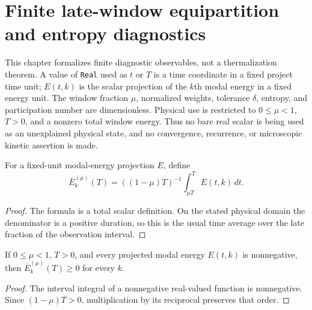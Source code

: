 
\chapter{Finite late-window equipartition and entropy diagnostics}
\label{ch:ArchonPhysics_EquipartitionEntropy}

This chapter formalizes finite diagnostic observables, not a thermalization
theorem.  A value of \texttt{Real} used as $t$ or $T$ is a time coordinate in
a fixed project time unit; $E(t,k)$ is the scalar projection of the $k$th
modal energy in a fixed energy unit.  The window fraction $\mu$, normalized
weights, tolerance $\delta$, entropy, and participation number are
dimensionless.  Physical use is restricted to $0\leq\mu<1$, $T>0$, and a
nonzero total window energy.  Thus no bare real scalar is being used as an
unexplained physical state, and no convergence, recurrence, or microscopic
kinetic assertion is made.

\begin{definition}
\label{def:thermal:late-window-average}
For a fixed-unit modal-energy projection $E$, define
\[
 \overline E_k^{(\mu)}(T)=((1-\mu)T)^{-1}\int_{\mu T}^{T}E(t,k)\,dt.
\]
\end{definition}
\begin{proof}

\leanok
The formula is a total scalar definition.  On the stated physical domain the
denominator is a positive duration, so this is the usual time average over
the late fraction of the observation interval.
\end{proof}

\begin{theorem}
\label{thm:thermal:late-window-nonneg}
If $0\leq\mu<1$, $T>0$, and every projected modal energy $E(t,k)$ is
nonnegative, then $\overline E_k^{(\mu)}(T)\geq0$ for every $k$.
\end{theorem}
\begin{proof}

\leanok
The interval integral of a nonnegative real-valued function is nonnegative.
Since $(1-\mu)T>0$, multiplication by its reciprocal preserves that order.
\end{proof}

